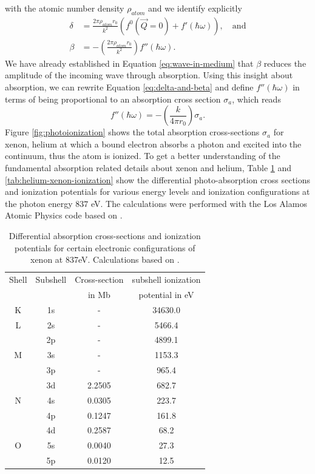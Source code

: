 with the atomic number density $\rho_{atom}$ and we identify explicitly
\begin{align}
\delta &= \frac{2 \pi \rho_{atom} r_{0}}{k^{2}}\left(f^{0}\left(\vec{Q}=0\right)+f'\left(\hbar\omega\right)\right),\quad \text{and}\\
\beta &= - \left(\frac{2\pi \rho_{atom}r_{0}}{k^{2}}\right)f''\left(\hbar\omega\right).
\label{eq:delta-and-beta}
\end{align}
We have already established in Equation \eqref{eq:wave-in-medium} that $\beta$ reduces the amplitude of the incoming wave through absorption. Using this insight about absorption, we can rewrite Equation \eqref{eq:delta-and-beta} and define $f''\left(\hbar\omega\right)$ in terms of being proportional to an absorption cross section $\sigma_{a}$, which reads
\begin{equation}
f''\left(\hbar\omega\right)=-\left(\frac{k}{4\pi r_{0}}\right)\sigma_{a}.
\label{eq:f-2-definition}
\end{equation}
Figure \ref{fig:photoionization} shows the total absorption cross-sections $\sigma_{a}$ for xenon, helium at which a bound electron absorbs a photon and excited into the continuum, thus the atom is ionized. To get a better understanding of the fundamental absorption related details about xenon and helium, Table \ref{tab:xenon-photoionization-cross-section} and \ref{tab:helium-xenon-ionization} show the differential photo-absorption cross sections and ionization potentials for various energy levels and ionization configurations at the photon energy $837$ eV. The calculations were performed with the Los Alamos Atomic Physics code based on \citep{Cowan-1981-Cal}.
\begin{table}
	\centering
		\begin{tabular}{ | c | c | c | c | }
			\hline
			Shell & Subshell & Cross-section & subshell ionization \\
				&	& in Mb & potential in eV \\ \hline
			K & 1s & - & 34630.0 \\ \hline
			L & 2s & - & 5466.4  \\ 
			\ & 2p & - & 4899.1 \\ \hline
			M & 3s & - & 1153.3  \\ 
			\ & 3p & - & 965.4 \\ 
			\ & 3d & 2.2505 & 682.7 \\ \hline
			N & 4s & 0.0305 & 223.7 \\ 
			\ & 4p & 0.1247 & 161.8 \\ 
			\ & 4d & 0.2587 & 68.2  \\ \hline
			O & 5s & 0.0040 & 27.3  \\ 
			\ & 5p & 0.0120 & 12.5  \\ \hline
		\end{tabular}
	\caption[Differential absorption cross-sections and ionization potentials for xenon.]{Differential absorption cross-sections and ionization potentials for certain electronic configurations of xenon at 837eV. Calculations based on \citep{Cowan-1981-Cal}.}
	\label{tab:xenon-photoionization-cross-section}
\end{table}
